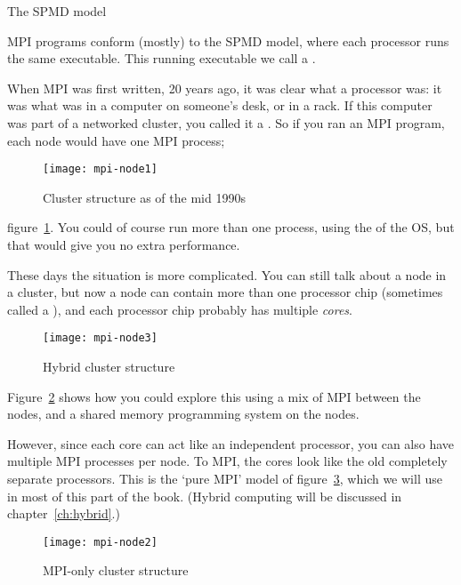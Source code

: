 
%
 {The SPMD model}
\label{sec:spmd}

MPI programs conform (mostly)
to the \acf{SPMD} model, where each processor runs the same executable.
This running executable we call a .

When MPI was first written, 20 years ago, it was clear what a processor
was: it was what was in a computer on someone's desk, or in a rack.
If this computer was part of a networked cluster, you called it a .
So if you ran an MPI program, each node would have one MPI process;
%
\begin{figure}[ht]
  \texttt{[image: mpi-node1]}
  \caption{Cluster structure as of the mid 1990s}
  \label{fig:oldmpi}
\end{figure}
%
figure~\ref{fig:oldmpi}.
%
You could of course run more than one
process, using the  of the \ac{OS}, but that
would give you no extra performance.

These days the situation is more complicated.
You can still talk about a node in a cluster, but now a node can contain
more than one processor chip (sometimes called a ),
and each processor chip probably has multiple
\emph{cores}.
%
\begin{figure}[ht]
  \texttt{[image: mpi-node3]}
  \caption{Hybrid cluster structure}
  \label{fig:hybridmpi}
\end{figure}
%
Figure~\ref{fig:hybridmpi} shows how you could explore this using a mix
of MPI between the nodes, and a shared memory programming system on the nodes.

However, since each core can act like an independent processor,
you can also have multiple MPI processes per node. To MPI, the cores look
like the old completely separate processors. This is the `pure MPI'
model of figure~\ref{fig:purempi}, which we will use in most of this part
of the book. (Hybrid computing will be discussed in chapter~\ref{ch:hybrid}.)
%
\begin{figure}[ht]
  \texttt{[image: mpi-node2]}
  \caption{MPI-only cluster structure}
  \label{fig:purempi}
\end{figure}
%

